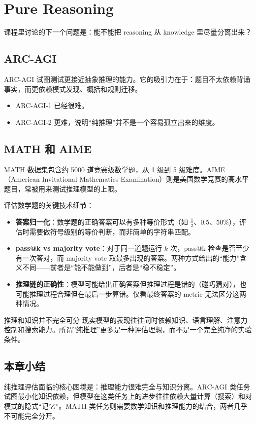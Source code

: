 \section{Pure Reasoning}

课程里讨论的下一个问题是：能不能把 reasoning 从 knowledge 里尽量分离出来？

\subsection{ARC-AGI}

ARC-AGI 试图测试更接近抽象推理的能力。它的吸引力在于：题目不太依赖背诵事实，而更依赖模式发现、概括和规则迁移。

\begin{itemize}
    \item ARC-AGI-1 已经很难。
    \item ARC-AGI-2 更难，说明``纯推理''并不是一个容易孤立出来的维度。
\end{itemize}

\subsection{MATH 和 AIME}

MATH 数据集包含约 5000 道竞赛级数学题，从 1 级到 5 级难度。AIME（American Invitational Mathematics Examination）则是美国数学竞赛的高水平题目，常被用来测试推理模型的上限。

评估数学题的关键技术细节：
\begin{itemize}
    \item \textbf{答案归一化}：数学题的正确答案可以有多种等价形式（如 $\frac{1}{2}$、$0.5$、$50\%$），评估时需要做符号级别的等价判断，而非简单的字符串匹配。
    \item \textbf{pass@k vs majority vote}：对于同一道题运行 $k$ 次，pass@k 检查是否至少有一次答对，而 majority vote 取最多出现的答案。两种方式给出的``能力''含义不同——前者是``能不能做到''，后者是``稳不稳定''。
    \item \textbf{推理链的正确性}：模型可能给出正确答案但推理过程是错的（碰巧猜对），也可能推理过程合理但在最后一步算错。仅看最终答案的 metric 无法区分这两种情况。
\end{itemize}

\begin{knowledgebox}{推理和知识并不完全可分}
现实模型的表现往往同时依赖知识、语言理解、注意力控制和搜索能力。所谓”纯推理”更多是一种评估理想，而不是一个完全纯净的实验条件。
\end{knowledgebox}

\subsection{本章小结}

纯推理评估面临的核心困境是：推理能力很难完全与知识分离。ARC-AGI 类任务试图最小化知识依赖，但模型在这类任务上的进步往往依赖大量计算（搜索）和对模式的隐式``记忆''。MATH 类任务则需要数学知识和推理能力的结合，两者几乎不可能完全分开。


